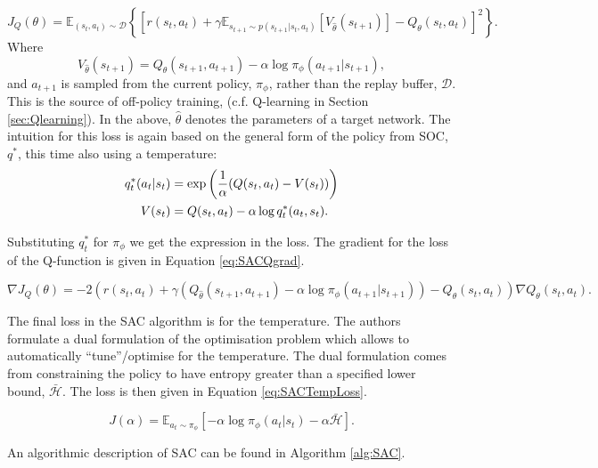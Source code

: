 \documentclass{report}
\numberwithin{equation}{section}
\numberwithin{figure}{section}
\numberwithin{table}{section}
\numberwithin{algorithm}{section}
\begin{document}
\begin{equation}\label{eq:SACQfuncLoss}
  J_Q(\theta)=\mathbb{E}_{(s_t,a_t)\sim \mathcal{D}}\left\{\left[
    r(s_t, a_t) 
    + \gamma \mathbb{E}_{s_{t+1}\sim p(s_{t+1}|s_t, a_t)}[V_{\hat{\theta}}(s_{t+1})]
    - Q_\theta(s_t,a_t)
  \right]^2\right\}.
\end{equation}
Where 
\begin{equation*}
  V_{\hat{\theta}}(s_{t+1})=Q_{\hat{\theta}}(s_{t+1},a_{t+1}) 
  - \alpha \log \pi_\phi(a_{t+1}|s_{t+1}),
\end{equation*}
and $a_{t+1}$ is sampled from the current policy, $\pi_\phi$, rather 
than the replay buffer, $\mathcal{D}$. This is the source of off-policy 
training, (c.f. Q-learning in Section \ref{sec:Qlearning}). In the above, 
$\hat{\theta}$ denotes the parameters of a target 
network. The intuition for this loss is again based on the 
general form of the policy from SOC, $q^*$, this time also using 
a temperature:
\begin{align}
  q_t^*(a_t|s_t)&=\exp\left(
    \frac{1}{\alpha}(Q(s_t,a_t) - V(s_t))
  \right)\notag\\
  V(s_t)&=Q(s_t,a_t) - \alpha \log q_t^*(a_t,s_t).
\end{align}

Substituting $q^*_t$ for $\pi_\phi$ we get the expression in the 
loss. The gradient for the loss of the Q-function is given in 
Equation \ref{eq:SACQgrad}.

\begin{equation}\label{eq:SACQgrad}
  \nabla J_Q(\theta)=-2\left(
    r(s_t,a_t) + \gamma(
      Q_{\hat{\theta}}(s_{t+1},a_{t+1}) - \alpha \log \pi_\phi(a_{t+1}|s_{t+1})
    )
    - Q_\theta(s_t, a_t)
  \right)\nabla Q_\theta(s_t, a_t).
\end{equation}

The final loss in the SAC algorithm is for the temperature. 
The authors formulate a dual formulation of the optimisation 
problem which allows to automatically ``tune''/optimise for 
the temperature. The dual formulation comes from constraining 
the policy to have entropy greater than a specified lower 
bound, $\bar{\mathcal{H}}$.
The loss is then given in Equation \ref{eq:SACTempLoss}.

\begin{equation}\label{eq:SACTempLoss}
  J(\alpha)=\mathbb{E}_{a_t\sim \pi_\phi}[-\alpha \log \pi_\phi(a_t|s_t) - \alpha \bar{\mathcal{H}}].
\end{equation}

An algorithmic description of SAC can be found in Algorithm 
\ref{alg:SAC}.
\end{document}
